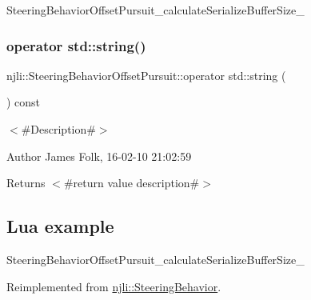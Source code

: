 \begin{DoxyCodeInclude}
\end{DoxyCodeInclude}
Steering\+Behavior\+Offset\+Pursuit\+\_\+calculate\+Serialize\+Buffer\+Size\+\_\+ \mbox{\label{classnjli_1_1_steering_behavior_offset_pursuit_aa0266d0f37251d241f0365b24bf37458}} 
\subsubsection{\texorpdfstring{operator std\+::string()}{operator std::string()}}
{\footnotesize\ttfamily njli\+::\+Steering\+Behavior\+Offset\+Pursuit\+::operator std\+::string (\begin{DoxyParamCaption}{ }\end{DoxyParamCaption}) const\hspace{0.3cm}{\ttfamily [virtual]}}



$<$\#\+Description\#$>$ 

\begin{DoxyAuthor}{Author}
James Folk, 16-\/02-\/10 21\+:02\+:59
\end{DoxyAuthor}
\begin{DoxyReturn}{Returns}
$<$\#return value description\#$>$
\end{DoxyReturn}
\hypertarget{classnjli_1_1_steering_behavior_wander_ex1}{}\subsection{Lua example}\label{classnjli_1_1_steering_behavior_wander_ex1}

\begin{DoxyCodeInclude}
\end{DoxyCodeInclude}
Steering\+Behavior\+Offset\+Pursuit\+\_\+calculate\+Serialize\+Buffer\+Size\+\_\+ 

Reimplemented from \mbox{\hyperlink{classnjli_1_1_steering_behavior_acd7af46e42a8a3fc1208a47f50836ac8}{njli\+::\+Steering\+Behavior}}.

\mbox{\label{classnjli_1_1_steering_behavior_offset_pursuit_a7f492f13e8e82c49ef536638b28e339c}} 
